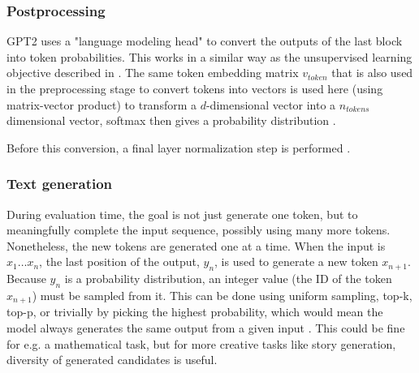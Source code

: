 \subsubsection{Postprocessing}


\label{gpt2:postproc}

GPT2 uses a "language modeling head" \cite{HuggingFaceGPT2} to convert the outputs of the last block into token probabilities. This works in a similar way as the unsupervised learning objective described in . The same token embedding matrix $v_{token}$ that is also used in the preprocessing stage to convert tokens into vectors is used here (using matrix-vector product) to transform a $d$-dimensional vector into a $n_{tokens}$ dimensional vector, softmax then gives a probability distribution \cite{github-hf} .

Before this conversion, a final layer normalization step is performed .


\subsubsection{Text generation}


During evaluation time, the goal is not just generate one token, but to meaningfully complete the input sequence, possibly using many more tokens.
Nonetheless, the new tokens are generated one at a time. When the input is $x_1 \ldots x_n$, the last position of the output, $y_n$, is used to generate a new token $x_{n+1}$.
Because $y_n$ is a probability distribution, an integer value (the ID of the token $x_{n+1}$) must be sampled from it. This can be done using uniform sampling,
top-k, top-p, or trivially by picking the highest probability, which would mean the model always generates the same output from a given input \cite{hf-howtogeneratetext}.
This could be fine for e.g. a mathematical task, but for more creative tasks like story generation, diversity of generated candidates is useful.

